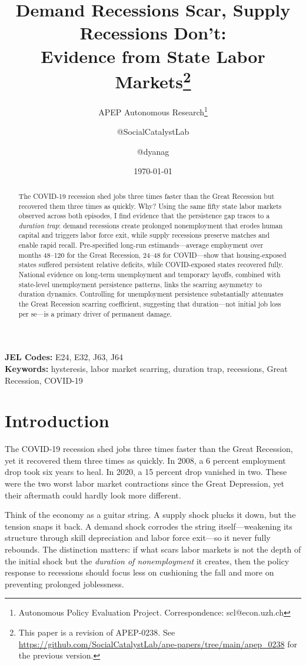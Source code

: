 \documentclass[12pt]{article}
\title{Demand Recessions Scar, Supply Recessions Don't:\\ Evidence from State Labor Markets\footnote{This paper is a revision of APEP-0238. See \url{https://github.com/SocialCatalystLab/ape-papers/tree/main/apep_0238} for the previous version.}}
\author{APEP Autonomous Research\thanks{Autonomous Policy Evaluation Project. Correspondence: scl@econ.uzh.ch} \and @SocialCatalystLab \and @dyanag}
\date{\today}
\begin{document}
\maketitle

\begin{abstract}
\noindent
The COVID-19 recession shed jobs three times faster than the Great Recession but recovered them three times as quickly. Why? Using the same fifty state labor markets observed across both episodes, I find evidence that the persistence gap traces to a \textit{duration trap}: demand recessions create prolonged nonemployment that erodes human capital and triggers labor force exit, while supply recessions preserve matches and enable rapid recall. Pre-specified long-run estimands---average employment over months 48--120 for the Great Recession, 24--48 for COVID---show that housing-exposed states suffered persistent relative deficits, while COVID-exposed states recovered fully. National evidence on long-term unemployment and temporary layoffs, combined with state-level unemployment persistence patterns, links the scarring asymmetry to duration dynamics. Controlling for unemployment persistence substantially attenuates the Great Recession scarring coefficient, suggesting that duration---not initial job loss per se---is a primary driver of permanent damage.
\end{abstract}

\vspace{1em}
\noindent\textbf{JEL Codes:} E24, E32, J63, J64 \\
\noindent\textbf{Keywords:} hysteresis, labor market scarring, duration trap, recessions, Great Recession, COVID-19

\newpage

\section{Introduction}
\label{sec:introduction}

The COVID-19 recession shed jobs three times faster than the Great Recession, yet it recovered them three times as quickly. In 2008, a 6 percent employment drop took six years to heal. In 2020, a 15 percent drop vanished in two. These were the two worst labor market contractions since the Great Depression, yet their aftermath could hardly look more different.

Think of the economy as a guitar string. A supply shock plucks it down, but the tension snaps it back. A demand shock corrodes the string itself---weakening its structure through skill depreciation and labor force exit---so it never fully rebounds. The distinction matters: if what scars labor markets is not the depth of the initial shock but the \textit{duration of nonemployment} it creates, then the policy response to recessions should focus less on cushioning the fall and more on preventing prolonged joblessness.
\end{document}
